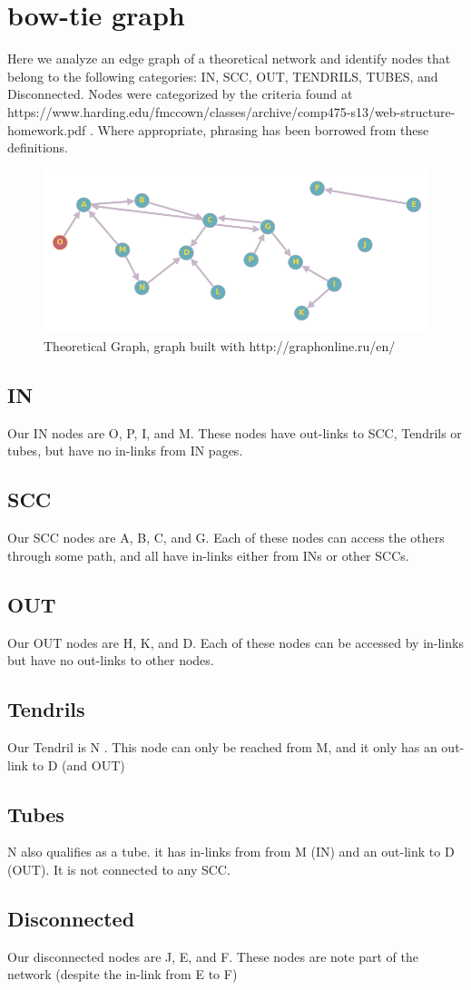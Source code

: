 \documentclass[11pt]{article}
\begin{document}
		
	\section{bow-tie graph}
		\hspace{10mm}Here we analyze an edge graph of a theoretical network and identify nodes that belong
		to the following categories: IN, SCC, OUT, TENDRILS, TUBES, and Disconnected. Nodes were categorized by the criteria found at https://www.harding.edu/fmccown/classes/archive/comp475-s13/web-structure-homework.pdf . Where appropriate, phrasing has been borrowed from these definitions.    
		\begin{figure}[H]
			\includegraphics[scale=0.5]{resources/graph.png}
			\caption{Theoretical Graph, graph built with http://graphonline.ru/en/}
		\end{figure}
		\subsection{IN}
		Our IN nodes are O, P, I, and M. These nodes have out-links to SCC, Tendrils or tubes, but have no
		in-links from IN pages. 
		\subsection{SCC}
		Our SCC nodes are A, B, C, and G.  Each of these nodes can access the others through some path, and all have in-links either from INs or other SCCs.
		\subsection{OUT}
		Our OUT nodes are H, K, and D. Each of these nodes can be accessed by in-links but have no out-links to other nodes. 
		\subsection{Tendrils}
		Our Tendril is N . This node can only be reached from M, and it only has an out-link to D (and OUT)
		\subsection{Tubes}
		N also qualifies as a tube. it has in-links from from M (IN) and an out-link to D (OUT). It is not
		connected to any SCC. 
		\subsection{Disconnected}
		Our disconnected nodes are J, E, and F.  These nodes are note part of the network (despite the 
		in-link from E to F)
		
		
	
	
\end{document}
